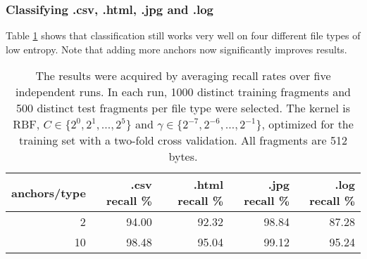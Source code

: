 \subsubsection{Classifying .csv, .html, .jpg and .log}

Table \ref{table:csv_html_jpg_log_recall} shows that classification still
works very well on four different file types of low entropy. Note that
adding more anchors now significantly improves results.


\begin{table}[h]
\begin{tabular}{rrrrr}
\hline
   anchors/type &   .csv recall \% &   .html recall \% &   .jpg recall \% &   .log recall \% \\
\hline
              2 &           94.00    &            92.32 &           98.84 &           87.28 \\
             10 &           98.48 &            95.04 &           99.12 &           95.24 \\
\hline
\end{tabular}
\caption{
The results were acquired by averaging recall rates over five
independent runs. In each run, 1000 distinct training fragments and 500
distinct test fragments per file type were selected. The kernel is RBF, $C
\in \{ 2^{0}, 2^{1}, \dots, 2^{5} \}$ and $\gamma \in \{2^{-7}, 2^{-6},
\dots, 2^{-1} \}$, optimized for the training set with a two-fold cross
validation. All fragments are 512 bytes.}
\label{table:csv_html_jpg_log_recall}
\end{table}
